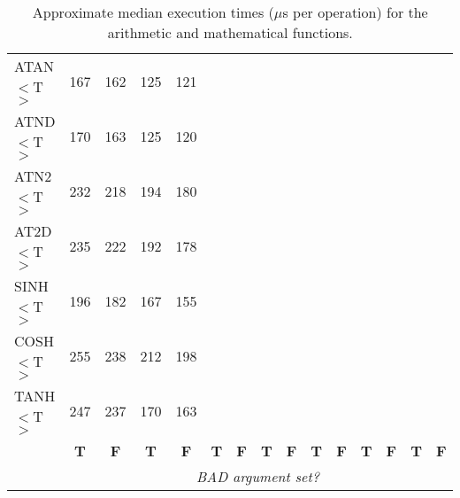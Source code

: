\begin{table}[h]
\begin{center}
{\begin{tabular}{|l|r|r||r|r||r|r||r|r||r|r||r|r||r|r|}
ATAN$<$T$>$ &  167 &  162 &  125 &  121 &      &      &      &      &      &      &      &      &      &      \\
ATND$<$T$>$ &  170 &  163 &  125 &  120 &      &      &      &      &      &      &      &      &      &      \\
ATN2$<$T$>$ &  232 &  218 &  194 &  180 &      &      &      &      &      &      &      &      &      &      \\
AT2D$<$T$>$ &  235 &  222 &  192 &  178 &      &      &      &      &      &      &      &      &      &      \\
SINH$<$T$>$ &  196 &  182 &  167 &  155 &      &      &      &      &      &      &      &      &      &      \\
COSH$<$T$>$ &  255 &  238 &  212 &  198 &      &      &      &      &      &      &      &      &      &      \\
TANH$<$T$>$ &  247 &  237 &  170 &  163 &      &      &      &      &      &      &      &      &      &      \\
\hline
\multicolumn{1}{c}{} &
\multicolumn{1}{|c}{\bf T} & \multicolumn{1}{|c||}{\bf F} &
\multicolumn{1}{c}{\bf T} & \multicolumn{1}{|c||}{\bf F} &
\multicolumn{1}{c}{\bf T} & \multicolumn{1}{|c||}{\bf F} &
\multicolumn{1}{c}{\bf T} & \multicolumn{1}{|c||}{\bf F} &
\multicolumn{1}{c}{\bf T} & \multicolumn{1}{|c||}{\bf F} &
\multicolumn{1}{c}{\bf T} & \multicolumn{1}{|c||}{\bf F} &
\multicolumn{1}{c}{\bf T} & \multicolumn{1}{|c|}{\bf F}\\
\cline{2-15}
\multicolumn{1}{c}{} &
\multicolumn{14}{|c|}{\em BAD argument set?}\\
\cline{2-15}
\end{tabular}
}
\caption{Approximate median execution times ($\mu$s per operation) for the
 arithmetic and mathematical functions.}
\label{table:valstats}
\end{center}
\end{table}

\newpage

